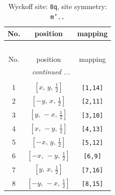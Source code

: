 \documentclass[fleqn,8pt]{jsarticle}
\begin{document}
\begin{longtable}{ccc}
\caption{Wyckoff site: {\tt 8q}, site symmetry: {\tt m'..}}
 \\
 \hline \hline
No. & position & mapping \\ \hline \endfirsthead

\multicolumn{2}{l}{\tablename\ \thetable{}} \\
 \hline \hline
No. & position & mapping \\ \hline \endhead

 \hline \hline
\multicolumn{2}{r}{\footnotesize\it continued ...} \\ \endfoot

 \hline \hline
\multicolumn{2}{r}{} \\ \endlastfoot

1 & $\left[ x,\, y,\, \frac{1}{2} \right]$ & {\tt [1,14]} \\ \hline
2 & $\left[ - y,\, x,\, \frac{1}{2} \right]$ & {\tt [2,11]} \\ \hline
3 & $\left[ y,\, - x,\, \frac{1}{2} \right]$ & {\tt [3,10]} \\ \hline
4 & $\left[ x,\, - y,\, \frac{1}{2} \right]$ & {\tt [4,13]} \\ \hline
5 & $\left[ - x,\, y,\, \frac{1}{2} \right]$ & {\tt [5,12]} \\ \hline
6 & $\left[ - x,\, - y,\, \frac{1}{2} \right]$ & {\tt [6,9]} \\ \hline
7 & $\left[ y,\, x,\, \frac{1}{2} \right]$ & {\tt [7,16]} \\ \hline
8 & $\left[ - y,\, - x,\, \frac{1}{2} \right]$ & {\tt [8,15]} \\
\end{longtable}
\renewcommand{\arraystretch}{1.2}
\end{document}
